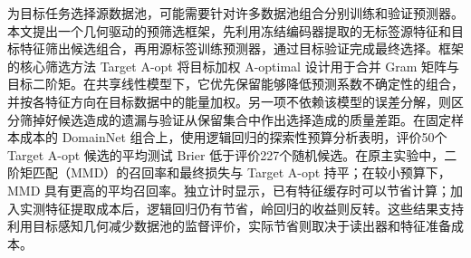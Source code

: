 为目标任务选择源数据池，可能需要针对许多数据池组合分别训练和验证预测器。本文提出一个几何驱动的预筛选框架，先利用冻结编码器提取的无标签源特征和目标特征筛出候选组合，再用源标签训练预测器，通过目标验证完成最终选择。框架的核心筛选方法 Target A-opt 将目标加权 A-optimal 设计用于合并 Gram 矩阵与目标二阶矩。在共享线性模型下，它优先保留能够降低预测系数不确定性的组合，并按各特征方向在目标数据中的能量加权。另一项不依赖该模型的误差分解，则区分筛掉好候选造成的遗漏与验证从保留集合中作出选择造成的质量差距。在固定样本成本的 DomainNet 组合上，使用逻辑回归的探索性预算分析表明，评价50个 Target A-opt 候选的平均测试 Brier 低于评价227个随机候选。在原主实验中，二阶矩匹配（MMD）的召回率和最终损失与 Target A-opt 持平；在较小预算下，MMD 具有更高的平均召回率。独立计时显示，已有特征缓存时可以节省计算；加入实测特征提取成本后，逻辑回归仍有节省，岭回归的收益则反转。这些结果支持利用目标感知几何减少数据池的监督评价，实际节省则取决于读出器和特征准备成本。
